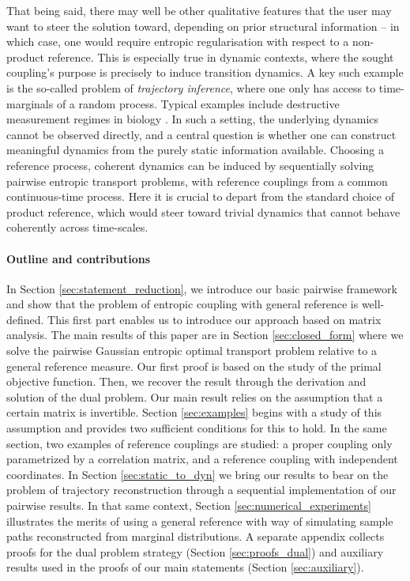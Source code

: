 \documentclass[]{article}
\numberwithin{equation}{section}
\theoremstyle{plain}
\begin{document}
That being said, there may well be other qualitative features that the user may want to steer the solution toward, depending on prior structural information -- in which case, one would require entropic regularisation with respect to a non-product reference. This is especially true in dynamic contexts, where the sought coupling's purpose is precisely to induce transition dynamics. A key such example is the so-called problem of \emph{trajectory inference}, where one only has access to time-marginals of a random process. Typical examples include destructive measurement regimes in biology \cite{fischer2019inferring}. %
In such a setting, the underlying dynamics cannot be observed directly, and a central question is whether one can construct meaningful dynamics from the purely static information available. Choosing a reference process, coherent dynamics can be induced by sequentially solving pairwise entropic transport problems, with reference couplings from a common continuous-time process. Here it is crucial to depart from the standard choice of product reference, which would steer toward trivial dynamics that cannot behave coherently across time-scales.\\


\color{Black}
\paragraph{Outline and contributions} In Section \ref{sec:statement_reduction}, we introduce our basic pairwise framework and show that the problem of entropic coupling with general reference is well-defined. This first part enables us to introduce our approach based on matrix analysis. The main results of this paper are in Section \ref{sec:closed_form} where we solve the pairwise Gaussian entropic optimal transport problem relative to a general reference measure. Our first proof is based on the study of the primal objective function. Then, we recover the result through the derivation and solution of the dual problem. Our main result relies on the assumption that a certain matrix is invertible. Section \ref{sec:examples} begins with a study of this assumption and provides two sufficient conditions for this to hold. In the same section, two examples of reference couplings are studied: a proper coupling only parametrized by a correlation matrix, and a reference coupling with independent coordinates. In Section \ref{sec:static_to_dyn} we bring our results to bear on the problem of trajectory reconstruction %
through a sequential implementation of our pairwise results. In that same context,  Section \ref{sec:numerical_experiments} illustrates the merits of using a general reference with way of simulating sample paths reconstructed from marginal distributions. A separate appendix collects proofs for the dual problem strategy (Section \ref{sec:proofs_dual}) and auxiliary results used in the proofs of our main statements (Section \ref{sec:auxiliary}).
\end{document}
